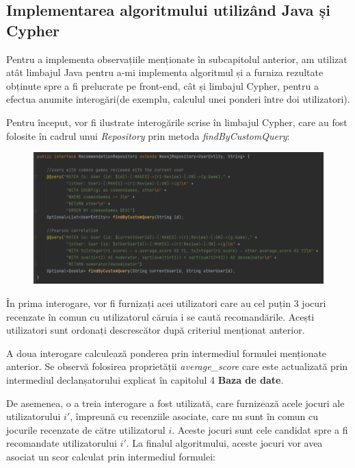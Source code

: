 \documentclass[12pt,a4paper]{report}
\begin{document}
\subsection{Implementarea algoritmului utilizând Java și Cypher}

Pentru a implementa observațiile menționate în subcapitolul anterior, am utilizat atât limbajul Java pentru a-mi implementa algoritmul și a furniza rezultate obținute spre a fi prelucrate pe front-end, cât și limbajul Cypher, pentru a efectua anumite interogări(de exemplu, calculul unei ponderi între doi utilizatori).

Pentru început, vor fi ilustrate interogările scrise în limbajul Cypher, care au fost folosite în cadrul unui \emph{Repository} prin metoda \emph{findByCustomQuery}:

\begin{figure}[H]
\centering
\caption{}
\includegraphics[scale = 0.7]{exemplu_25_recom_repository}
\caption*{}
\end{figure}

În prima interogare, vor fi furnizați acei utilizatori care au cel puțin 3 jocuri recenzate în comun cu utilizatorul căruia i se caută recomandările. Acești utilizatori sunt ordonați descrescător după criteriul menționat anterior.

A doua interogare calculează ponderea prin intermediul formulei menționate anterior. Se observă folosirea proprietății \emph{average\_score} care este actualizată prin intermediul declanșatorului explicat în capitolul 4 \textbf{Baza de date}.

\bigskip

De asemenea, o a treia interogare a fost utilizată, care furnizează acele jocuri ale utilizatorului \( i' \), împreună cu recenziile asociate, care nu sunt în comun cu jocurile recenzate de către utilizatorul \( i \). Aceste jocuri sunt cele candidat spre a fi recomandate utilizatorului \( i' \). La finalul algoritmului, aceste jocuri vor avea asociat un scor calculat prin intermediul formulei:
\end{document}
